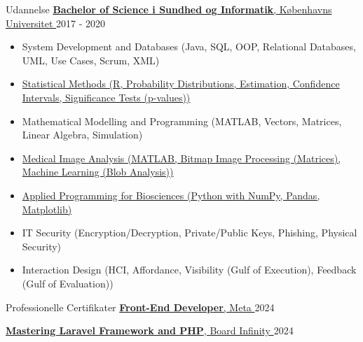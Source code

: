 \documentclass{resume}
\begin{document}
\begin{rSection}{Udannelse}
    \href{https://sund.ku.dk}{
        \textbf{Bachelor of Science i Sundhed og Informatik}, Københavns Universitet
    }
    \hfill
    2017 - 2020
    \begin{itemize}
        \item System Development and Databases (Java, SQL, OOP, Relational Databases, UML, Use Cases, Scrum, XML)
        \item \href{https://kurser.ku.dk/course/sitb17003u/2017-2018}{Statistical Methods (R, Probability Distributions, Estimation, Confidence Intervals, Significance Tests (p-values))}
        \item Mathematical Modelling and Programming (MATLAB, Vectors, Matrices, Linear Algebra, Simulation)
        \item \href{https://kurser.dtu.dk/course/22525}{Medical Image Analysis (MATLAB, Bitmap Image Processing (Matrices), Machine Learning (Blob Analysis))}
        \item \href{https://kurser.ku.dk/course/sbia10210u/2020-2021}{Applied Programming for Biosciences (Python with NumPy, Pandas, Matplotlib)}
        \item IT Security (Encryption/Decryption, Private/Public Keys, Phishing, Physical Security)
        \item Interaction Design (HCI, Affordance, Visibility (Gulf of Execution), Feedback (Gulf of Evaluation))
    \end{itemize}
\end{rSection}


\begin{rSection}{Professionelle Certifikater}
    \href{https://www.coursera.org/professional-certificates/meta-front-end-developer}{
        \textbf{Front-End Developer}, Meta
    }
    \hfill
    2024

    \href{https://www.coursera.org/learn/laravel-framework-and-php}{
        \textbf{Mastering Laravel Framework and PHP}, Board Infinity
    }
    \hfill
    2024
\end{rSection}
\end{document}
